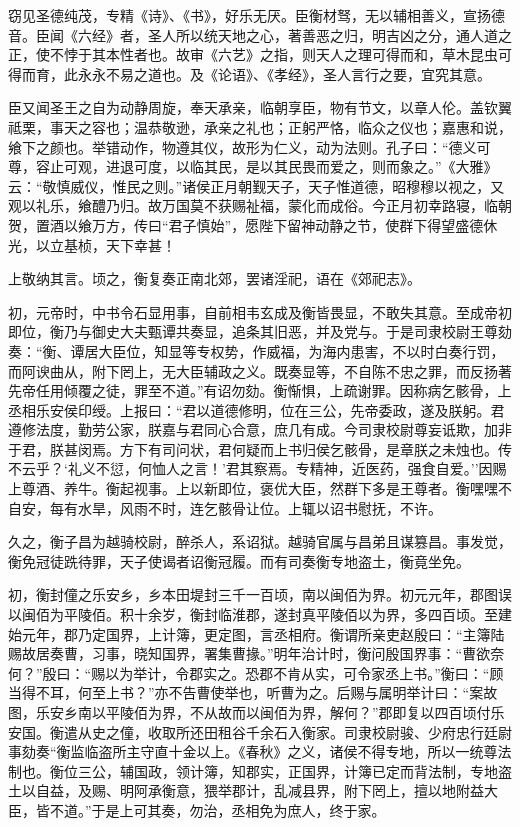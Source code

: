 \documentclass[]{article}
\begin{document}
窃见圣德纯茂，专精《诗》、《书》，好乐无厌。臣衡材驽，无以辅相善义，宣扬德音。臣闻《六经》者，圣人所以统天地之心，著善恶之归，明吉凶之分，通人道之正，使不悖于其本性者也。故审《六艺》之指，则天人之理可得而和，草木昆虫可得而育，此永永不易之道也。及《论语》、《孝经》，圣人言行之要，宜究其意。

臣又闻圣王之自为动静周旋，奉天承亲，临朝享臣，物有节文，以章人伦。盖钦翼祗栗，事天之容也；温恭敬逊，承亲之礼也；正躬严恪，临众之仪也；嘉惠和说，飨下之颜也。举错动作，物遵其仪，故形为仁义，动为法则。孔子曰：``德义可尊，容止可观，进退可度，以临其民，是以其民畏而爱之，则而象之。''《大雅》云：``敬慎威仪，惟民之则。''诸侯正月朝觐天子，天子惟道德，昭穆穆以视之，又观以礼乐，飨醴乃归。故万国莫不获赐祉福，蒙化而成俗。今正月初幸路寝，临朝贺，置酒以飨万方，传曰``君子慎始''，愿陛下留神动静之节，使群下得望盛德休光，以立基桢，天下幸甚！

上敬纳其言。顷之，衡复奏正南北郊，罢诸淫祀，语在《郊祀志》。

初，元帝时，中书令石显用事，自前相韦玄成及衡皆畏显，不敢失其意。至成帝初即位，衡乃与御史大夫甄谭共奏显，追条其旧恶，并及党与。于是司隶校尉王尊劾奏：``衡、谭居大臣位，知显等专权势，作威福，为海内患害，不以时白奏行罚，而阿谀曲从，附下罔上，无大臣辅政之义。既奏显等，不自陈不忠之罪，而反扬著先帝任用倾覆之徒，罪至不道。''有诏勿劾。衡惭惧，上疏谢罪。因称病乞骸骨，上丞相乐安侯印绶。上报曰：``君以道德修明，位在三公，先帝委政，遂及朕躬。君遵修法度，勤劳公家，朕嘉与君同心合意，庶几有成。今司隶校尉尊妄诋欺，加非于君，朕甚闵焉。方下有司问状，君何疑而上书归侯乞骸骨，是章朕之未烛也。传不云乎？`礼义不愆，何恤人之言！'君其察焉。专精神，近医药，强食自爱。''因赐上尊酒、养牛。衡起视事。上以新即位，褒优大臣，然群下多是王尊者。衡嘿嘿不自安，每有水旱，风雨不时，连乞骸骨让位。上辄以诏书慰抚，不许。

久之，衡子昌为越骑校尉，醉杀人，系诏狱。越骑官属与昌弟且谋篡昌。事发觉，衡免冠徒跣待罪，天子使谒者诏衡冠履。而有司奏衡专地盗土，衡竟坐免。

初，衡封僮之乐安乡，乡本田堤封三千一百顷，南以闽佰为界。初元元年，郡图误以闽佰为平陵佰。积十余岁，衡封临淮郡，遂封真平陵佰以为界，多四百顷。至建始元年，郡乃定国界，上计簿，更定图，言丞相府。衡谓所亲吏赵殷曰：``主簿陆赐故居奏曹，习事，晓知国界，署集曹掾。''明年治计时，衡问殷国界事：``曹欲奈何？''殷曰：``赐以为举计，令郡实之。恐郡不肯从实，可令家丞上书。''衡曰：``顾当得不耳，何至上书？''亦不告曹使举也，听曹为之。后赐与属明举计曰：``案故图，乐安乡南以平陵佰为界，不从故而以闽佰为界，解何？''郡即复以四百顷付乐安国。衡遣从史之僮，收取所还田租谷千余石入衡家。司隶校尉骏、少府忠行廷尉事劾奏``衡监临盗所主守直十金以上。《春秋》之义，诸侯不得专地，所以一统尊法制也。衡位三公，辅国政，领计簿，知郡实，正国界，计簿已定而背法制，专地盗土以自益，及赐、明阿承衡意，猥举郡计，乱减县界，附下罔上，擅以地附益大臣，皆不道。''于是上可其奏，勿治，丞相免为庶人，终于家。
\end{document}
